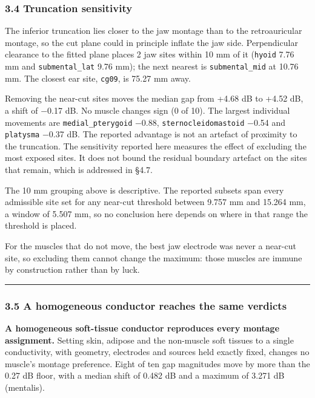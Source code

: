 \documentclass[
  11pt,
]{article}
\begin{document}
\subsubsection{3.4 Truncation sensitivity}\label{truncation-sensitivity}

The inferior truncation lies closer to the jaw montage than to the
retroauricular montage, so the cut plane could in principle inflate the jaw
side. Perpendicular clearance to the fitted plane places 2 jaw sites within
10 mm of it (\texttt{hyoid} 7.76 mm and \texttt{submental\_lat} 9.76 mm); the next nearest is
\texttt{submental\_mid} at 10.76 mm. The closest ear site, \texttt{cg09}, is 75.27 mm away.

Removing the near-cut sites moves the median gap from +4.68 dB to +4.52 dB, a
shift of −0.17 dB. No muscle changes sign (0 of 10). The largest individual
movements are \texttt{medial\_pterygoid} −0.88, \texttt{sternocleidomastoid} −0.54 and
\texttt{platysma} −0.37 dB. The reported advantage is not an artefact of proximity to
the truncation. The sensitivity reported here measures the effect of excluding
the most exposed sites. It does not bound the residual boundary artefact on the
sites that remain, which is addressed in §4.7.

The 10 mm grouping above is descriptive. The reported subsets span every
admissible site set for any near-cut threshold between 9.757 mm and 15.264 mm, a
window of 5.507 mm, so no conclusion here depends on where in that range the
threshold is placed.

For the muscles that do not move, the best jaw electrode was never a near-cut
site, so excluding them cannot change the maximum: those muscles are immune by
construction rather than by luck.

\begin{center}\rule{0.5\linewidth}{0.5pt}\end{center}

\subsubsection{3.5 A homogeneous conductor reaches the same verdicts}\label{a-homogeneous-conductor-reaches-the-same-verdicts}

\textbf{A homogeneous soft-tissue conductor reproduces every montage assignment.}
Setting skin, adipose and the non-muscle soft tissues to a single conductivity,
with geometry, electrodes and sources held exactly fixed, changes no muscle's
montage preference. Eight of ten gap magnitudes move by more than the 0.27 dB
floor, with a median shift of 0.482 dB and a maximum of 3.271 dB (mentalis).
\end{document}
